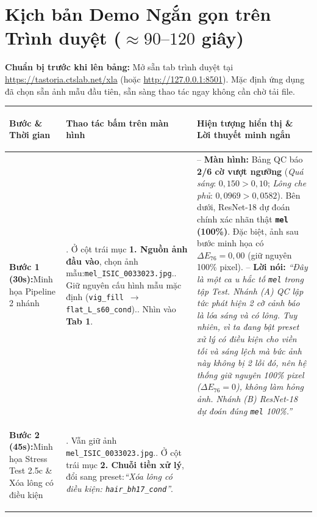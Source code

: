 \documentclass[11pt,a4paper]{article}
\begin{document}
\newpage
\section{Kịch bản Demo Ngắn gọn trên Trình duyệt ($\approx 90\text{--}120$ giây)}

\noindent\textbf{Chuẩn bị trước khi lên bảng:} Mở sẵn tab trình duyệt tại \url{https://tastoria.ctslab.net/xla} (hoặc \url{http://127.0.0.1:8501}). Mặc định ứng dụng đã chọn sẵn ảnh mẫu đầu tiên, sẵn sàng thao tác ngay không cần chờ tải file.

\vspace{4pt}
\noindent\begin{tabularx}{\textwidth}{>{\bfseries\raggedright\arraybackslash}p{2.5cm} >{\raggedright\arraybackslash}p{4.6cm} X}
\toprule
Bước \& Thời gian & Thao tác bấm trên màn hình & Hiện tượng hiển thị \& Lời thuyết minh ngắn \\
\midrule
\textbf{Bước 1 (30s):}\newline Minh họa Pipeline 2 nhánh &
1. Ở cột trái mục \textbf{1. Nguồn ảnh đầu vào}, chọn ảnh mẫu:\newline \texttt{mel\_ISIC\_0033023.jpg}.\newline
2. Giữ nguyên cấu hình mẫu mặc định (\texttt{vig\_fill $\rightarrow$ flat\_L\_s60\_cond}).\newline
3. Nhìn vào \textbf{Tab 1}. &
-- \textbf{Màn hình:} Bảng QC báo \textbf{2/6 cờ vượt ngưỡng} (\emph{Quá sáng}: $0{,}150 > 0{,}10$; \emph{Lông che phủ}: $0{,}0969 > 0{,}0582$). Bên dưới, ResNet-18 dự đoán chính xác nhãn thật \textbf{\texttt{mel} (100\%)}. Đặc biệt, ảnh sau bước minh họa có $\Delta E_{76} = 0{,}00$ (giữ nguyên 100\% pixel).\newline
-- \textbf{Lời nói:} \emph{``Đây là một ca u hắc tố \texttt{mel} trong tập Test. Nhánh (A) QC lập tức phát hiện 2 cờ cảnh báo là lóa sáng và có lông. Tuy nhiên, vì ta đang bật preset xử lý có điều kiện cho viền tối và sáng lệch mà bức ảnh này không bị 2 lỗi đó, nên hệ thống giữ nguyên 100\% pixel ($\Delta E_{76}=0$), không làm hỏng ảnh. Nhánh (B) ResNet-18 dự đoán đúng \texttt{mel} 100\%.''} \\
\midrule
\textbf{Bước 2 (45s):}\newline Minh họa Stress Test 2.5c \& Xóa lông có điều kiện &
1. Vẫn giữ ảnh \texttt{mel\_ISIC\_0033023.jpg}.\newline
2. Ở cột trái mục \textbf{2. Chuỗi tiền xử lý}, đổi sang preset:\newline \emph{``Xóa lông có điều kiện: \texttt{hair\_bh17\_cond}''}.\newline

\end{tabularx}
\end{document}
